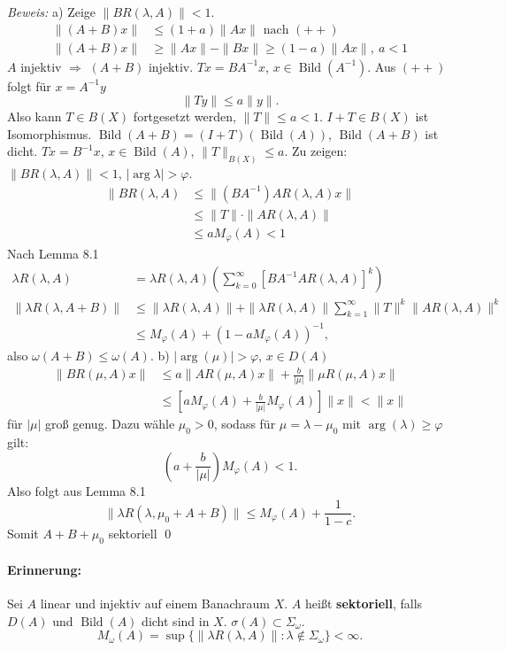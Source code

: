 \documentclass[12pt]{extreport} %
\DeclareMathOperator{\Bild}{Bild}
\numberwithin{equation}{section}
\newcommand{\om}{\omega}
\newcommand{\m}{\cdot}
\newcommand{\Bew}{\emph{Beweis: }}
\begin{document}
	\Bew a) Zeige $\|B R(\lambda, A)\|<1$.
	\begin{align*}
		\|(A+B)x\|&\leq (1+a)\|Ax\| \text{ nach } (++)\\
		\|(A+B)x\|&\geq \|Ax\|-\|Bx\| \geq (1-a)\|Ax\|, ~ a<1
	\end{align*}
	$A$ injektiv $\Rightarrow$ $(A+B)$ injektiv. $Tx = B A^{-1}x$, $x\in \Bild(A^{-1})$. Aus $(++)$ folgt für $x=A^{-1}y$
	$$\|Ty\|\leq a\|y\|.$$
	Also kann $T\in B(X)$ fortgesetzt werden, $\|T\|\leq a<1$. $I+T\in B(X)$ ist Isomorphismus. $\Bild(A+B) = (I+T)(\Bild(A))$, $\Bild(A+B)$ ist dicht. $Tx = B^{-1}x$, $x\in \Bild(A)$, $\|T\|_{B(X)}\leq a$. Zu zeigen: $\|BR(\lambda,A)\| <1$, $|\arg\lambda|>\varphi$. 
	\begin{align*}
		\|BR(\lambda,A) &\leq \|(BA^{-1})AR(\lambda, A)x\|\\
		&\leq \|T\| \m\|AR(\lambda, A)\|\\
		&\leq a M_\varphi(A) <1
	\end{align*}
	Nach Lemma 8.1
	\begin{align*}
		\lambda R(\lambda, A) &= \lambda R(\lambda, A) \left(\sum_{k = 0}^{\infty} [BA^{-1}A R(\lambda, A)]^k \right)\\
		\|\lambda R(\lambda, A+B)\|&\leq \|\lambda R(\lambda, A)\| + \|\lambda R(\lambda, A)\| \sum_{k = 1}^{\infty} \|T\|^k\|AR(\lambda,A)\|^k\\
		&\leq M_\varphi(A) + (1- a M_\varphi(A))^{-1},
	\end{align*}
	also $\om(A+B)\leq \om(A)$.
	b) $|\arg(\mu)|>\varphi$, $x\in D(A)$ 
	\begin{align*}
		\|BR(\mu,A)x\| &\leq a\|AR(\mu, A)x\| + \frac{b}{|\mu|} \|\mu R(\mu, A)x\|\\
		&\leq \left[a M_\varphi(A) + \frac{b}{|\mu|}M_\varphi(A)\right] \|x\|<\|x\|
	\end{align*}
	für $|\mu|$ groß genug. Dazu wähle $\mu_0>0$, sodass für $\mu= \lambda-\mu_0$ mit $\arg(\lambda)\geq \varphi$ gilt:
	$$\left(a+\frac{b}{|\mu|} \right)M_\varphi(A)<1.$$
	Also folgt aus Lemma 8.1 
	$$\|\lambda R(\lambda,\mu_0+A+B)\| \leq M_\varphi(A) + \frac{1}{1-c}.$$
	Somit $A+B+\mu_0$ sektoriell 
	\qed
	
	\paragraph{Erinnerung:}
	Sei $A$ linear und injektiv auf einem Banachraum $X$. $A$ heißt \textbf{sektoriell}, falls $D(A)$ und $\Bild(A)$ dicht sind in $X$. $\sigma(A)\subset \Sigma_\om$.
	$$M_\om (A) = \sup\{\|\lambda R(\lambda, A)\|\colon \lambda \notin\Sigma_\om \} < \infty.$$
	
\end{document}
